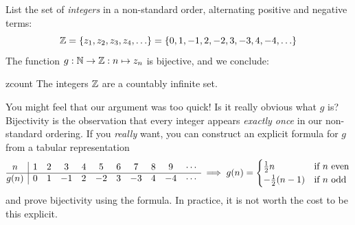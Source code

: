 \goodbreak


List the set of \emph{integers} in a non-standard order, alternating positive and negative terms:
\[
	\mathbb{Z}=\{z_1,z_2,z_3,z_4,\ldots\}=\{0,1,-1,2,-2,3,-3,4,-4,\ldots\}
\]
The function $g:\mathbb{N}\to\mathbb{Z}:n\mapsto z_n$ is bijective, and we conclude:

\begin{thm}{}{zcount}
	The integers $\mathbb{Z}$ are a countably infinite set.
\end{thm}

You might feel that our argument was too quick! Is it really obvious what $g$ is? Bijectivity is the observation that every integer appears \emph{exactly once} in our non-standard ordering. If you \emph{really} want, you can construct an explicit formula for $g$ from a tabular representation
\[
	\begin{array}{@{}c|cccccccccc}
		n&1&2&3&4&5&6&7&8&9&\cdots\\\hline
		g(n)&0&1&-1&2&-2&3&-3&4&-4&\cdots
	\end{array}
	\implies
	g(n)=
	\begin{cases}
		\frac 12n&\text{if $n$ even}\\
		-\frac 12(n-1)&\text{if $n$ odd}
	\end{cases}
\]
and prove bijectivity using the formula. In practice, it is not worth the cost to be this explicit.\smallbreak


% 
% 


